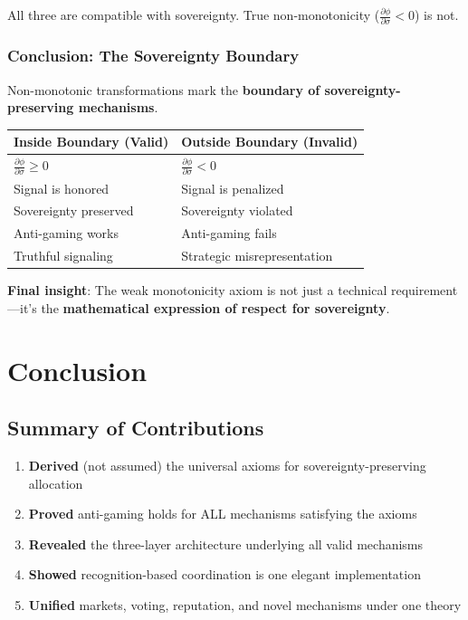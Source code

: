 \documentclass[11pt,a4paper]{article}
\theoremstyle{definition}
\theoremstyle{remark}
\begin{document}
All three are compatible with sovereignty. True non-monotonicity ($\frac{\partial \phi}{\partial \sigma} < 0$) is not.

\subsubsection{Conclusion: The Sovereignty Boundary}

Non-monotonic transformations mark the \textbf{boundary of sovereignty-preserving mechanisms}.

\begin{center}
\begin{tabular}{ll}
\toprule
\textbf{Inside Boundary (Valid)} & \textbf{Outside Boundary (Invalid)} \\
\midrule
$\frac{\partial \phi}{\partial \sigma} \ge 0$ & $\frac{\partial \phi}{\partial \sigma} < 0$ \\
Signal is honored & Signal is penalized \\
Sovereignty preserved & Sovereignty violated \\
Anti-gaming works & Anti-gaming fails \\
Truthful signaling & Strategic misrepresentation \\
\bottomrule
\end{tabular}
\end{center}

\textbf{Final insight}: The weak monotonicity axiom is not just a technical requirement—it's the \textbf{mathematical expression of respect for sovereignty}.

\section{Conclusion}

\subsection{Summary of Contributions}

\begin{enumerate}
\item \textbf{Derived} (not assumed) the universal axioms for sovereignty-preserving allocation
\item \textbf{Proved} anti-gaming holds for ALL mechanisms satisfying the axioms
\item \textbf{Revealed} the three-layer architecture underlying all valid mechanisms
\item \textbf{Showed} recognition-based coordination is one elegant implementation
\item \textbf{Unified} markets, voting, reputation, and novel mechanisms under one theory
\end{enumerate}
\end{document}
